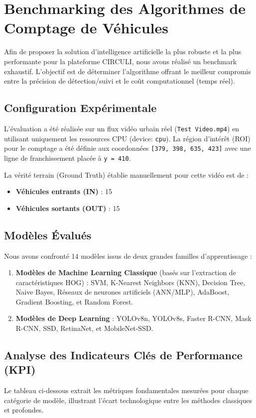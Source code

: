 \section{Benchmarking des Algorithmes de Comptage de Véhicules}
Afin de proposer la solution d'intelligence artificielle la plus robuste et la plus performante pour la plateforme CIRCULI, nous avons réalisé un benchmark exhaustif. L'objectif est de déterminer l'algorithme offrant le meilleur compromis entre la précision de détection/suivi et le coût computationnel (temps réel).

\subsection{Configuration Expérimentale}
L'évaluation a été réalisée sur un flux vidéo urbain réel (\texttt{Test Video.mp4}) en utilisant uniquement les ressources CPU (device: \texttt{cpu}). La région d'intérêt (ROI) pour le comptage a été définie aux coordonnées \texttt{[379, 398, 635, 423]} avec une ligne de franchissement placée à \texttt{y = 410}. 

La vérité terrain (Ground Truth) établie manuellement pour cette vidéo est de :
\begin{itemize}
    \item \textbf{Véhicules entrants (IN)} : 15
    \item \textbf{Véhicules sortants (OUT)} : 15
\end{itemize}

\subsection{Modèles Évalués}
Nous avons confronté 14 modèles issus de deux grandes familles d'apprentissage :
\begin{enumerate}
    \item \textbf{Modèles de Machine Learning Classique} (basés sur l'extraction de caractéristiques HOG) : SVM, K-Nearest Neighbors (KNN), Decision Tree, Naive Bayes, Réseaux de neurones artificiels (ANN/MLP), AdaBoost, Gradient Boosting, et Random Forest.
    \item \textbf{Modèles de Deep Learning} : YOLOv8n, YOLOv8s, Faster R-CNN, Mask R-CNN, SSD, RetinaNet, et MobileNet-SSD.
\end{enumerate}

\subsection{Analyse des Indicateurs Clés de Performance (KPI)}
Le tableau ci-dessous extrait les métriques fondamentales mesurées pour chaque catégorie de modèle, illustrant l'écart technologique entre les méthodes classiques et profondes.

